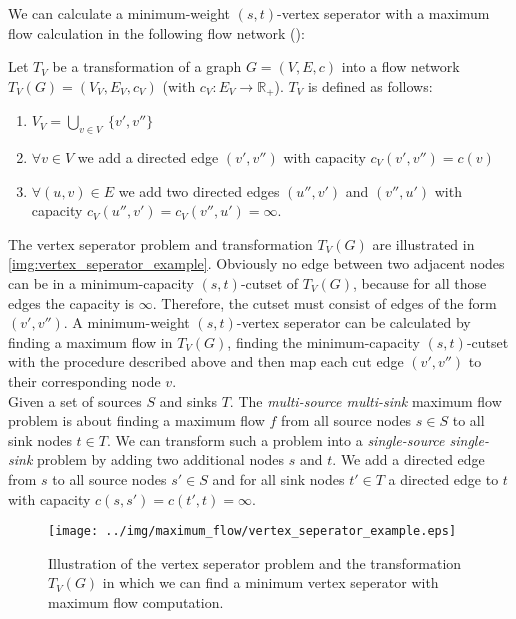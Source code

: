 We can calculate a minimum-weight $(s,t)$-vertex seperator with a maximum flow
calculation in the following flow network ():

\begin{definition}
\label{def:vertex_seperator_transformation}
Let $T_V$ be a transformation of a graph $G = (V,E,c)$ into 
a flow network $T_V(G) = (V_V, E_V, c_V)$ (with $c_V: E_V \rightarrow \mathbb{R}_+$). 
$T_V$ is defined as follows:
\begin{enumerate}
\item $V_V = \bigcup\limits_{v \in V}\ \{v', v''\}$
\item $\forall v \in V$ we add a directed edge $(v',v'')$
      with capacity $c_V(v',v'') = c(v)$
\item $\forall (u,v) \in E$ we add two directed edges $(u'', v')$ and 
      $(v'', u')$ with capacity $c_V(u'', v') = c_V(v'', u') = \infty$.
\end{enumerate} 
\end{definition}

The vertex seperator problem and transformation $T_V(G)$ are illustrated in \autoref{img:vertex_seperator_example}.
Obviously no edge between two adjacent nodes can be in a minimum-capacity $(s,t)$-cutset of $T_V(G)$,
because for all those edges the capacity is $\infty$. Therefore, the cutset must consist
of edges of the form $(v',v'')$. A minimum-weight $(s,t)$-vertex seperator can be calculated by
finding a maximum flow in $T_V(G)$, finding the minimum-capacity $(s,t)$-cutset with the procedure
described above and then map each cut edge $(v',v'')$ to their corresponding node $v$.\\
Given a set of sources $S$ and sinks $T$. The \emph{multi-source multi-sink} maximum flow problem is
about finding a maximum flow $f$ from all source nodes $s \in S$ to all sink nodes $t \in T$.
We can transform such a problem into a \emph{single-source single-sink} problem by adding
two additional nodes $s$ and $t$. We add a directed edge from $s$ to all source nodes $s' \in S$ 
and for all sink nodes $t' \in T$ a directed edge to $t$ with capacity 
$c(s,s') = c(t',t) = \infty$.

\begin{figure}
\centering
\texttt{[image: ../img/maximum\_flow/vertex\_seperator\_example.eps]}
\caption{ Illustration of the vertex seperator problem and the transformation $T_V(G)$ in which
          we can find a minimum vertex seperator with maximum flow computation. }
\label{img:vertex_seperator_example}
\end{figure}

